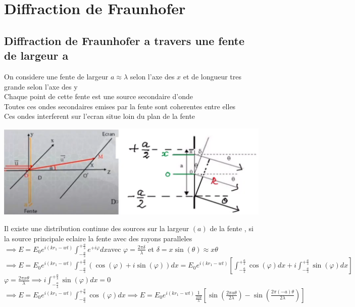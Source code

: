 \documentclass[12pt]{book}
\begin{document}
        \section{Diffraction de Fraunhofer}      
            \subsection{Diffraction de Fraunhofer a travers une fente de largeur a}
                On considere une fente de largeur $a \approx \lambda$ selon l'axe des $x$ et de longueur tres grande selon l'axe des y \\
                Chaque point de cette fente est une source secondaire d'onde \\
                Toutes ces ondes secondaires emises par la fente sont coherentes entre elles \\
                Ces ondes interferent sur l'ecran situe loin du plan de la fente
                \begin{center}
                    \includegraphics[width=0.7\linewidth]{pic/diffractionfente.png}
                \end{center}
                Il existe une distribution continue des sources sur la largeur $(a)$ de la fente , si la source principale eclaire la fente avec des rayons paralleles \\
                $\implies E = E_0e^{i(kr_1-wt)}\int^{+\frac{a}{s}}_{-\frac{a}{s}}e^{+i\varphi}dx $avec $\varphi = \frac{2\pi\delta}{\lambda}$ et $\delta = x\sin(\theta)\approx x\theta$  \\
                $\implies  E = E_0e^{i(kr_1-wt)}\int^{+\frac{a}{s}}_{-\frac{a}{s}}(\cos(\varphi)+i\sin(\varphi))dx = E_0e^{i(kr_1-wt)}\left[ \int^{+\frac{a}{s}}_{-\frac{a}{s}}\cos(\varphi)dx + i\int^{+\frac{a}{s}}_{-\frac{a}{s}}\sin(\varphi)dx \right]$\\
                $\varphi = \frac{2\pi x\theta}{\lambda}\implies i\int^{+\frac{a}{s}}_{-\frac{a}{s}}\sin(\varphi)dx =0$ \\
                $\implies E = E_0e^{i(kr_1-wt)}\int^{+\frac{a}{s}}_{-\frac{a}{s}}\cos(\varphi)dx \implies E =  E_0e^{i(kr_1-wt)} \frac{1}{\frac{2\pi\theta}{\lambda}}\left[ \sin(\frac{2\pi a \theta}{2\lambda}) -\sin(\frac{2\pi(-a)\theta}{2\lambda}) \right] $\\
\end{document}
